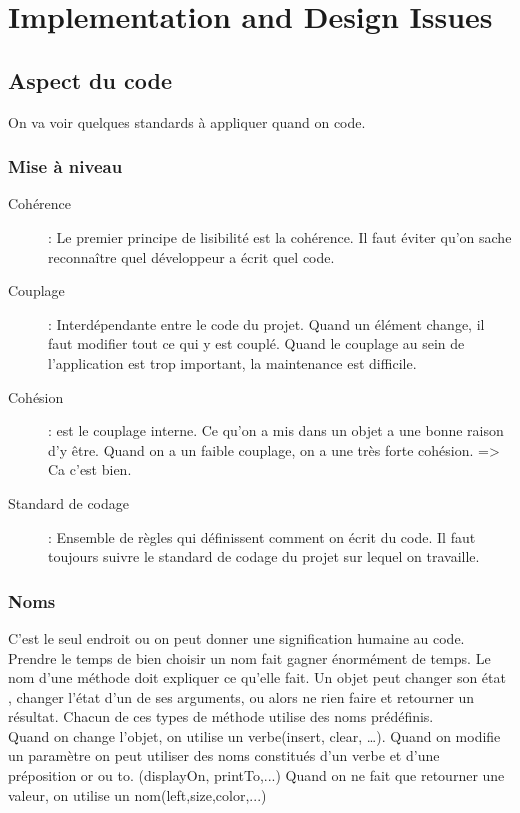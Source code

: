 \section{Implementation and Design Issues}

\subsection{Aspect du code}
On va voir quelques standards à appliquer quand on code.

\subsubsection{Mise à niveau}
\begin{description}
	\item[Cohérence]: Le premier principe de lisibilité est la cohérence. Il faut éviter qu’on sache reconnaître quel développeur a écrit quel code.
	\item[Couplage]: Interdépendante entre le code du projet. Quand un élément change, il faut modifier tout ce qui y est couplé. Quand le couplage au sein de l’application est trop important, la maintenance est difficile.

	\item[Cohésion]: est le couplage interne. Ce qu’on a mis dans un objet a une bonne raison d’y être. Quand on a un faible couplage, on a une très forte cohésion. => Ca c’est bien.

	\item[Standard de codage]: Ensemble de règles qui définissent comment on écrit du code. Il faut toujours suivre le standard de codage du projet sur lequel on travaille.
\end{description}

\subsubsection{Noms}
C’est le seul endroit ou on peut donner une signification humaine au code. Prendre le temps de bien choisir un nom fait gagner énormément de temps.
Le nom d’une méthode doit expliquer ce qu’elle fait. Un objet peut changer son état , changer l’état d’un de ses arguments, ou alors ne rien faire et retourner un résultat. Chacun de ces types de méthode utilise des noms prédéfinis. 
\\Quand on change l’objet, on utilise un verbe(insert, clear, …).
Quand on modifie un paramètre on peut utiliser des noms constitués d’un verbe et d’une préposition or ou to. (displayOn, printTo,...) 
Quand on ne fait que retourner une valeur, on utilise un nom(left,size,color,...)

